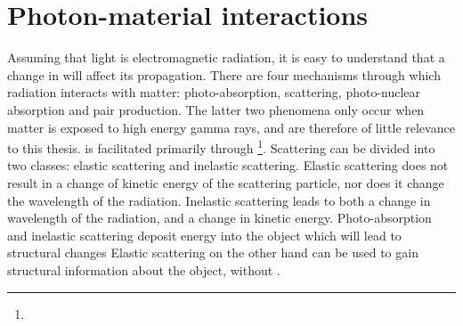 \section{Photon-material interactions}
Assuming that light is electromagnetic radiation, it is easy to
understand that a change in \DIFdelbegin {}\DIFdelend \DIFaddbegin {}\DIFaddend will affect its
propagation. There are four mechanisms through which radiation
interacts with matter: photo-absorption, scattering, photo-nuclear
absorption and pair production. The latter two phenomena only occur
when matter is exposed to high energy gamma rays, and are therefore of
little relevance to this thesis. \DIFdelbegin {}\DIFdelend \DIFaddbegin {}\DIFaddend is facilitated
primarily through \DIFdelbegin {}\DIFdelend \DIFaddbegin {}\footnote{}\DIFaddend . Scattering can be
divided into two classes: elastic scattering and inelastic
scattering. \DIFdelbegin {}\DIFdelend Elastic scattering does not result in a change of kinetic
energy of the scattering particle, nor does it change the wavelength
of the radiation. \DIFaddbegin {}\DIFaddend Inelastic scattering leads to both a change in wavelength of
the radiation, and a change in kinetic energy\DIFdelbegin {}\DIFdelend . Photo-absorption and
inelastic scattering deposit energy into the object which will lead to
structural changes \DIFdelbegin {}\DIFdelend \DIFaddbegin {}\DIFaddend Elastic scattering on the
other hand can be used to gain structural information about the
object, without \DIFdelbegin {}\DIFdelend \DIFaddbegin {}\DIFaddend .

